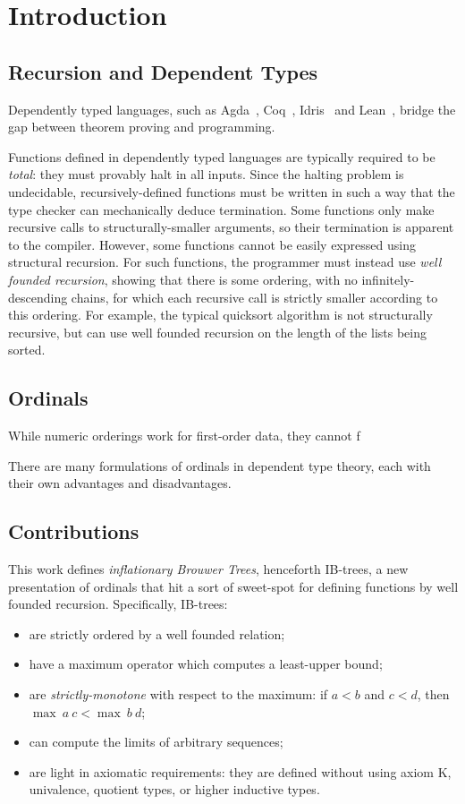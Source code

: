 \section{Introduction}

\subsection{Recursion and Dependent Types}
Dependently typed languages, such as Agda~\citep{TODO}, Coq~\citep{coqart},
Idris~\citep{TODO} and Lean~\citep{TODO}, bridge the gap between theorem
proving and programming.

Functions defined in dependently typed languages are typically required to be
\textit{total}: they must provably halt in all inputs. Since the halting problem
is undecidable, recursively-defined functions must be written in such a way that the type checker
can mechanically deduce termination.
Some functions only make recursive calls to structurally-smaller arguments,
so their termination is apparent to the compiler. However, some functions
cannot be easily expressed using structural recursion.
For such functions, the programmer must instead use \textit{well founded recursion}, showing that there is some ordering, with no infinitely-descending
chains, for which each recursive call is strictly smaller according to this ordering. For example, the typical quicksort algorithm is not structurally recursive, but can use well founded recursion on the length of the lists being sorted.

\subsection{Ordinals}

While numeric orderings work for first-order data, they cannot f

There are many formulations of ordinals in dependent type theory, each with their own advantages and disadvantages.


\subsection{Contributions}

This work defines \textit{inflationary Brouwer Trees}, henceforth IB-trees,
a new presentation of ordinals that hit a sort of sweet-spot for defining functions by
well founded recursion. Specifically, IB-trees:

\begin{itemize}
  \item are strictly ordered by a well founded relation;
  \item have a maximum operator which computes a least-upper bound;
  \item are \textit{strictly-monotone} with respect to the maximum: if $a < b$ and $c < d$, then $\max\ a\ c < \max\ b\ d$;
  \item can compute the limits of arbitrary sequences;
  \item are light in axiomatic requirements: they are defined without using axiom K,
        univalence, quotient types, or higher inductive types.
\end{itemize}

